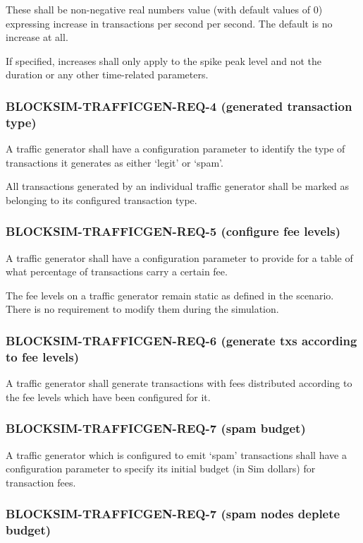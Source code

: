 \documentclass{scrreprt}
\begin{document}
These shall be non-negative real numbers value (with default values of 0)
expressing increase in transactions per second per second. The default
is no increase at all.

If specified, increases shall only apply to the spike peak level and not the
duration or any other time-related parameters.


\subsubsection{BLOCKSIM-TRAFFICGEN-REQ-4 (generated transaction type)}

A traffic generator shall have a configuration parameter to
identify the type of transactions it generates as either `legit' or `spam'.

All transactions generated by an individual traffic generator shall
be marked as belonging to its configured transaction type.


\subsubsection{BLOCKSIM-TRAFFICGEN-REQ-5 (configure fee levels)}

A traffic generator shall have a configuration parameter to
provide for a table of what percentage of transactions carry a certain fee.

The fee levels on a traffic generator remain static as defined in the scenario.
There is no requirement to modify them during the simulation.


\subsubsection{BLOCKSIM-TRAFFICGEN-REQ-6 (generate txs according to fee levels)}

A traffic generator shall generate transactions with fees distributed
according to the fee levels which have been configured for it.


\subsubsection{BLOCKSIM-TRAFFICGEN-REQ-7 (spam budget)}

A traffic generator which is configured to emit `spam' transactions
shall have a configuration parameter to specify its initial budget
(in Sim dollars) for transaction fees.


\subsubsection{BLOCKSIM-TRAFFICGEN-REQ-7 (spam nodes deplete budget)}
\end{document}
